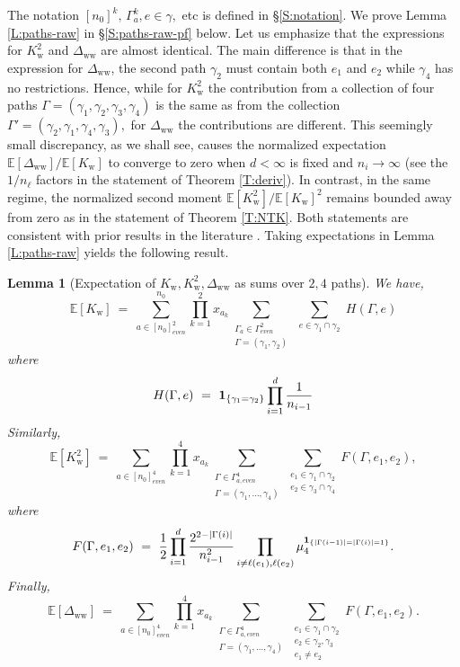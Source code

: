 \documentclass[11pt, reqno]{amsart}
\newtheorem{lemma}[theorem]{Lemma}
\newcommand{\E}[1]{{\mathbb E}\left [#1\right]}
\newcommand{\gives}{\ensuremath{\rightarrow}}
\newcommand{\e}{\mathbb E}
\newcommand{\abs}[1]{\ensuremath{\left| #1 \right|}}
\newcommand{\lr}[1]{\ensuremath{\left(#1 \right)}}
\newcommand{\set}[1]{\ensuremath{\{#1\}}}
\newcommand{\Kw}{K_{\mathrm{w}}}
\newcommand{\Dww}{\Delta_{\mathrm{ww}}}
\begin{document}
The notation $[n_0]^k,\, \Gamma_a^k,e\in \gamma,$ etc is defined in \S \ref{S:notation}. We prove Lemma \ref{L:paths-raw} in \S \ref{S:paths-raw-pf} below. Let us emphasize that the expressions for $\Kw^2$ and $\Dww$ are almost identical. The main  difference is that in the expression for $\Dww$, the second path $\gamma_2$ must contain both $e_1$ and $e_2$ while $\gamma_4$ has no restrictions. Hence, while for $\Kw^2$ the contribution from a collection of four paths $\Gamma=\lr{\gamma_1,\gamma_2,\gamma_3,\gamma_4}$ is the same as from the collection $\Gamma'=\lr{\gamma_2,\gamma_1, \gamma_4, \gamma_3},$ for $\Dww$ the contributions are different. This seemingly small discrepancy, as we shall see, causes the normalized expectation $\E{\Dww}/\E{\Kw}$ to converge to zero when $d<\infty$ is fixed and $n_i\gives \infty$ (see the $1/n_\ell$ factors in the statement of Theorem \ref{T:deriv}). In contrast, in the same regime, the normalized second moment $\E{\Kw^2}/\E{\Kw}^2$ remains bounded away from zero as in the statement of Theorem \ref{T:NTK}. Both statements are consistent with prior results in the literature \cite{dyer2018asymptotics,jacot2018neural}. Taking expectations in Lemma \ref{L:paths-raw} yields the following result.  
\begin{lemma}[Expectation of $\Kw,\Kw^2,\Dww$ as sums over $2,4$ paths]\label{L:2k-paths-avg}
We have,
\begin{equation}\label{E:first-moment-2paths}
\E{\Kw}~=~\sum_{a\in [n_0]_{even}^2}^{n_0}\prod_{k=1}^2x_{a_k} \sum_{\substack{\Gamma_a\in \Gamma_{even}^2\\\Gamma=\lr{\gamma_1,\gamma_2}}} \sum_{\substack{e\in \gamma_1\cap \gamma_2}}H(\Gamma, e)
\end{equation}
where
\[H(\Gamma,e)~=~{\bf 1}_{\set{\gamma_1=\gamma_2}}\prod_{i=1}^d\frac{1}{n_{i-1}}\]
Similarly, 
\begin{equation}\label{E:second-moment-4paths}
\E{\Kw^2}~=~\sum_{a\in [n_0]_{even}^4}\prod_{k=1}^4 x_{a_k}\sum_{\substack{\Gamma\in \Gamma_{a, even}^4\\\Gamma=\lr{\gamma_1,\ldots, \gamma_4}}} \sum_{\substack{e_1\in \gamma_1\cap \gamma_2\\e_2\in \gamma_3\cap \gamma_4}}F(\Gamma, e_1,e_2),
\end{equation}
where
\[F(\Gamma,e_1,e_2)~=~\frac{1}{2}\prod_{i=1}^d\frac{2^{2-\abs{\Gamma(i)}}}{n_{i-1}^2} \prod_{i\neq \ell(e_1),\ell(e_2)}\mu_4^{{\bf 1}_{\set{\abs{\Gamma(i-1)}=\abs{\Gamma(i)}=1}}}.\]
Finally, 
\begin{equation}\label{E:SGD-4paths}
\E{\Dww}~=~\sum_{a\in [n_0]_{even}^4}\prod_{k=1}^4x_{a_k}\sum_{\substack{\Gamma\in \Gamma_{a, even}^4\\\Gamma=\lr{\gamma_1,\ldots, \gamma_4}}} \sum_{\substack{e_1\in \gamma_1\cap \gamma_2\\e_2\in \gamma_2, \gamma_3\\ e_1\neq e_2}}F(\Gamma, e_1,e_2).
\end{equation}
\end{lemma}
\end{document}
